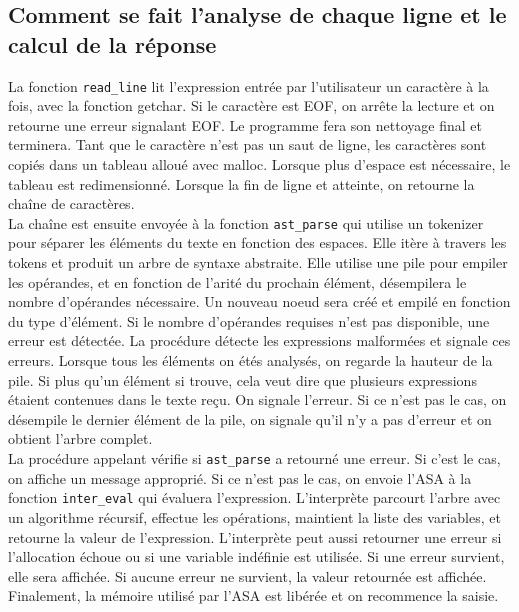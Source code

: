\documentclass[a4paper,12pt,french]{article}
\begin{document}
	\subsection{Comment se fait l’analyse de chaque ligne et le calcul de la réponse}
		La fonction \lstinline$read_line$ lit l'expression entrée par l'utilisateur un caractère à la fois,
		avec la fonction getchar. Si le caractère est EOF, on arrête la lecture et on retourne
		une erreur signalant EOF. Le programme fera son nettoyage final et terminera. Tant que
		le caractère n'est pas un saut de ligne, les caractères sont copiés dans un tableau
		alloué avec malloc. Lorsque plus d'espace est nécessaire, le tableau est redimensionné.
		Lorsque la fin de ligne et atteinte, on retourne la chaîne de caractères.\\

		La chaîne est ensuite envoyée à la fonction \lstinline$ast_parse$ qui utilise un tokenizer pour séparer
		les éléments du texte en fonction des espaces. Elle itère à travers les tokens et produit un
		arbre de syntaxe abstraite. Elle utilise une pile pour empiler les opérandes, et en fonction
		de l'arité du prochain élément, désempilera le nombre d'opérandes nécessaire. Un nouveau
		noeud sera créé et empilé en fonction du type d'élément. Si le nombre d'opérandes requises
		n'est pas disponible, une erreur est détectée. La procédure détecte les expressions malformées
		et signale ces erreurs. Lorsque tous les éléments on étés analysés, on regarde la hauteur de
		la pile. Si plus qu'un élément si trouve, cela veut dire que plusieurs expressions étaient
		contenues dans le texte reçu. On signale l'erreur. Si ce n'est pas le cas, on désempile le dernier
		élément de la pile, on signale qu'il n'y a pas d'erreur et on obtient l'arbre complet.\\

		La procédure appelant vérifie si \lstinline$ast_parse$ a retourné une erreur. Si c'est le cas, on affiche
		un message approprié. Si ce n'est pas le cas, on envoie l'ASA à la fonction \lstinline$inter_eval$ qui évaluera
		l'expression. L'interprète parcourt l'arbre avec un algorithme récursif, effectue les opérations,
		maintient la liste des variables, et retourne la valeur de l'expression. L'interprète peut aussi
		retourner une erreur si l'allocation échoue ou si une variable indéfinie est utilisée. Si une erreur
		survient, elle sera affichée. Si aucune erreur ne survient, la valeur retournée est affichée.
		Finalement, la mémoire utilisé par l'ASA est libérée et on recommence la saisie.\\
\end{document}
